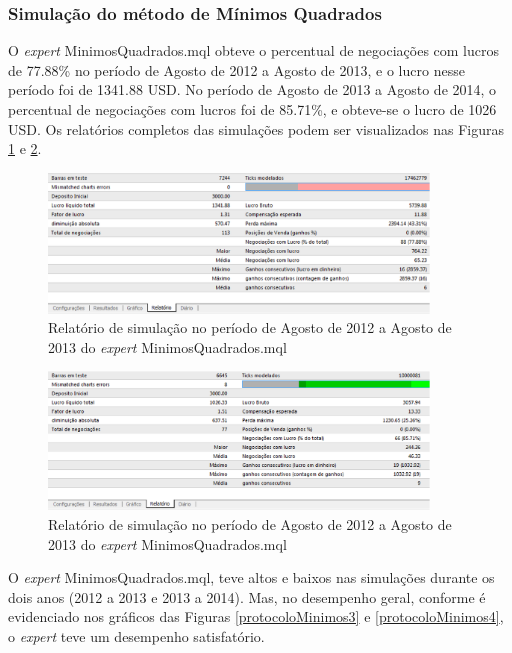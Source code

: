 \subsubsection{Simulação do método de Mínimos Quadrados}

O \textit{expert} MinimosQuadrados.mql obteve o percentual de negociações com lucros de 77.88\% no período de Agosto de 2012 a Agosto de 2013, e o  lucro nesse período foi de 1341.88 USD. No período de Agosto de 2013 a Agosto de 2014, o percentual de negociações com lucros foi de 85.71\%,  e obteve-se o lucro de 1026 USD. 
Os relatórios completos das simulações podem ser visualizados nas Figuras \ref{protocoloMinimos} e \ref{protocoloMinimos2}.

\begin{figure}[H]
\centering
\includegraphics[width=0.9\textwidth]{figuras/protocoloMinimos}
\caption{Relatório de simulação no período de Agosto de 2012 a Agosto de 2013 do \textit{expert} MinimosQuadrados.mql}
\label{protocoloMinimos}
\end{figure}

\begin{figure}[H]
\centering
\includegraphics[width=0.9\textwidth]{figuras/protocoloMinimos2}
\caption{Relatório de simulação no período de Agosto de 2012 a Agosto de 2013 do \textit{expert} MinimosQuadrados.mql}
\label{protocoloMinimos2}
\end{figure}

O \textit{expert} MinimosQuadrados.mql, teve altos e baixos nas simulações durante os dois anos (2012 a 2013 e 2013 a 2014). Mas, no desempenho geral, conforme é evidenciado nos gráficos das Figuras \ref{protocoloMinimos3} e \ref{protocoloMinimos4}, o \textit{expert} teve um desempenho satisfatório.

